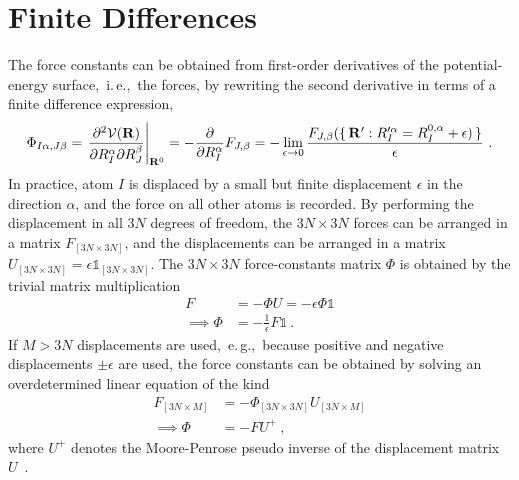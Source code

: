

\section{Finite Differences}
The force constants can be obtained from first-order derivatives of the potential-energy surface,~i.\,e.,~the forces, by rewriting the second derivative in terms of a finite difference expression,
\begin{align}
	\Phi_{I \alpha, J \beta}
		= \left.\frac{\partial^{2} \mathcal{V}(\mathbf{R})}{\partial R_{I}^{\alpha} \partial R_{J}^{\beta}}\right|_{\mathbf{R}^{0}}
		= - \frac{\partial}{\partial R_I^\alpha} F_{J, \beta}
		= - \lim_{\epsilon \to 0}
			\frac{F_{J, \beta} (\set{\b R': R^{\prime \alpha}_I = R^{0, \alpha}_I + \epsilon )}}{\epsilon}
		~.
\label{eq:FC2_finite}
\end{align}
In practice, atom $I$ is displaced by a small but finite displacement $\epsilon$ in the direction $\alpha$, and the force on all other atoms is recorded. By performing the displacement in all $3N$ degrees of freedom, the $3N \times 3N$ forces can be arranged in a matrix $F_{[3N \times 3N]}$, and the displacements can be arranged in a matrix $U_{[3N \times 3N]} = \epsilon \mathds 1_{[3N \times 3N]}$. The $3N \times 3N$ force-constants matrix $\Phi$ is obtained by the trivial matrix multiplication
\begin{align}
F 
	&= - \Phi U 
	= - \epsilon \Phi \mathds 1
	\label{eq:finite.diff.1}
	\\
	\implies
	\Phi &= - \frac{1}{\epsilon} F \mathds 1~.
\end{align}
If $M > 3N$ displacements are used,~e.\,g.,~because positive and negative displacements $\pm \epsilon$ are used, the force constants can be obtained by solving an overdetermined linear equation of the kind
\begin{align}
	F_{[3N \times M]} &= - \Phi_{[3N \times 3N]} U_{[3N \times M]} \\
	\implies
	\Phi &= - F U^{+}~,
	\label{eq:phi.pseudo.1}
\end{align}
where $U^{+}$ denotes the Moore-Penrose pseudo inverse of the displacement matrix $U$~\cite{Penrose1955,Parlinski1997}.

